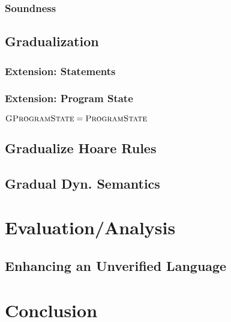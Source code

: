     \subsection{Soundness}

\section{Gradualization}
\label{sec:cs-gradual-formulas}


    \subsection{Extension: Statements}
    \label{ssec:extension--statements}
    

    \subsection{Extension: Program State}
    $\textup{\textsc{GProgramState}} = \textup{\textsc{ProgramState}}$

\section{Gradualize Hoare Rules}
\label{sec:gradualize-hoare-rules}


\section{Gradual Dyn. Semantics}



\chapter{Evaluation/Analysis}
\label{ch:evaluation-analysis}


\section{Enhancing an Unverified Language}
\label{sec:enhancing-an-unverified}



\chapter{Conclusion}
\label{ch:conclusion}


